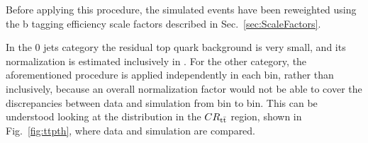 \noindent Before applying this procedure, the simulated events have been reweighted using the b tagging efficiency scale factors described in Sec.~\ref{sec:ScaleFactors}.

In the 0 jets category the residual top quark background is very small, and its normalization is estimated inclusively in \pth. For the other category, the aforementioned procedure is applied independently in each \pth bin, rather than inclusively, because an overall normalization factor would not be able to cover the discrepancies between data and simulation from bin to bin. This can be understood looking at the \pth distribution in the $CR_{\mathrm{t}\bar{\mathrm{t}}}$ region, shown in Fig.~\ref{fig:ttpth}, where data and simulation are compared.


